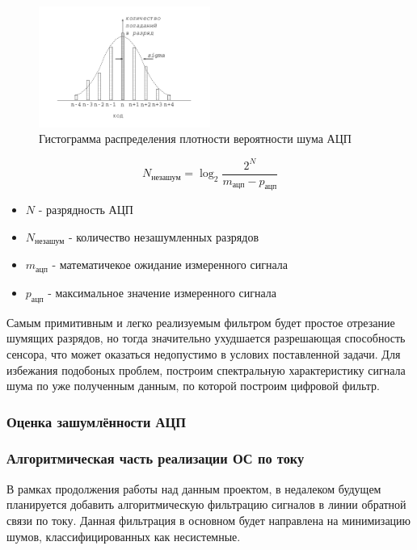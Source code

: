 \begin{figure}[!ht]
    \centering
    \includegraphics[width=0.5\textwidth, keepaspectratio, clip=true, trim=5mm 10mm 5mm 5mm]
                    {./src/pictures/adc_noise_probabilistic_estimate}
    \caption{Гистограмма распределения плотности вероятности шума АЦП}
    \label{pic_adc_noise_probabilistic_estimate}
\end{figure}

\begin{equation}
    \label{eq_noise_free_code_resolution}
    N_{\text{незашум}} = \log_{2} \frac{ 2^{N} }{ m_{\text{ацп}} - p_{\text{ацп}} }
\end{equation}

\begin{itemize}
    \item $ N $ - разрядность АЦП
    \item $ N_{\text{незашум}} $ - количество незашумленных разрядов
    \item $ m_{\text{ацп}} $ - математичекое ожидание измеренного сигнала
    \item $ p_{\text{ацп}} $ - максимальное значение измеренного сигнала
\end{itemize}

Самым примитивным и легко реализуемым фильтром будет простое отрезание шумящих разрядов,
но тогда значительно ухудшается разрешающая способность сенсора, что может
оказаться недопустимо в услових поставленной задачи. Для избежания подобоных проблем,
построим спектральную характеристику сигнала шума по уже полученным данным, по которой
построим цифровой фильтр.

\ifdefined\DIPLOMA
\subsubsection{Оценка зашумлённости АЦП}
\fi

\subsubsection{Алгоритмическая часть реализации ОС по току}
\ifdefined\DIPLOMA
\else
    В рамках продолжения работы над данным проектом, в недалеком будущем планируется добавить
    алгоритмическую фильтрацию сигналов в линии обратной связи по току. Данная фильтрация в
    основном будет направлена на минимизацию шумов, классифицированных как несистемные.
\fi

\endinput

